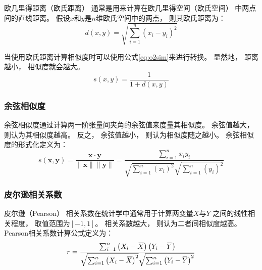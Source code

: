 欧几里得距离（欧氏距离）
通常是用来计算在欧几里得空间（欧氏空间）
中两点间的直线距离。
假设$x$和$y$是$n$维欧氏空间中的两点，
则其欧氏距离为：
\begin{equation}
    d(x,y)=\sqrt{\sum_{i=1}^n\left(x_i-y_i\right)^2}
\end{equation}

当使用欧氏距离计算相似度时可以使用公式\cref{eq:o2sim}来进行转换。
显然地，
距离越小，
相似度就会越大。
\begin{equation}
    \label{eq:o2sim}
    s(x,y)=\frac{1}{1+d(x,y)}
\end{equation}

\subsubsection{余弦相似度}

余弦相似度通过计算两一阶张量间夹角的余弦值来度量其相似度。
余弦值越大，
则认为其相似度越高。
反之，
余弦值越小，
则认为相似度随之越小。
余弦相似度的形式化定义为：
\begin{equation}
    s(\mathbf{x},\mathbf{y})=
    \frac{\mathbf{x}\cdot\mathbf{y}}{\lVert\mathbf{x}\rVert\lVert\mathbf{y}\rVert}
    =\frac{\sum_{i=1}^nx_iy_i}{\sqrt{\sum_{i=1}^n\left(x_i\right)^2}\sqrt{\sum_{i=1}^n\left(y_i\right)^2}}
\end{equation}

\subsubsection{皮尔逊相关系数}

皮尔逊（Pearson）
相关系数在统计学中通常用于计算两变量$X$与$Y$
之间的线性相关程度，
取值范围为$\left[-1,1\right]$。
相关系数越大，
则认为二者间相似度越高。
Pearson相关系数计算公式定义为：
\begin{equation}
    r=\frac{\sum_{i=1}^n\left(X_i-\overbari{X}\right)\left(Y_i-\overbar{Y}\right)}{\sqrt{\sum_{i=1}^n\left(X_i-\overbari{X}\right)^2}\sqrt{\sum_{i=1}^n\left(Y_i-\overbar{Y}\right)^2}}
\end{equation}
